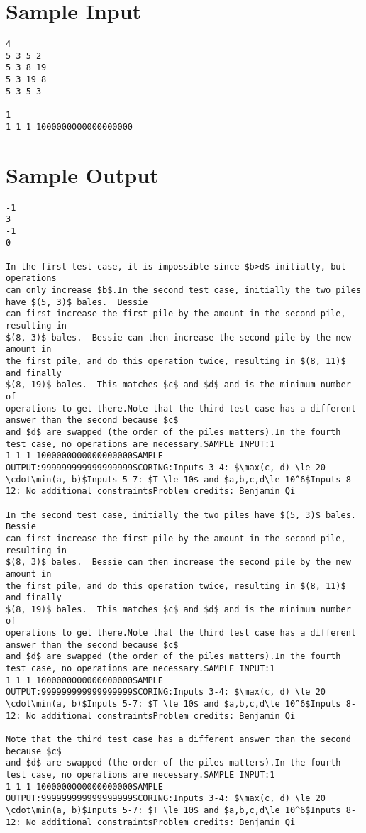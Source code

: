 \documentclass[12pt]{article}
\begin{document}
\section*{Sample Input}
\begin{verbatim}
4
5 3 5 2
5 3 8 19
5 3 19 8
5 3 5 3

1
1 1 1 1000000000000000000
\end{verbatim}

\section*{Sample Output}
\begin{verbatim}
-1
3
-1
0

In the first test case, it is impossible since $b>d$ initially, but operations
can only increase $b$.In the second test case, initially the two piles have $(5, 3)$ bales.  Bessie
can first increase the first pile by the amount in the second pile, resulting in
$(8, 3)$ bales.  Bessie can then increase the second pile by the new amount in
the first pile, and do this operation twice, resulting in $(8, 11)$ and finally
$(8, 19)$ bales.  This matches $c$ and $d$ and is the minimum number of
operations to get there.Note that the third test case has a different answer than the second because $c$
and $d$ are swapped (the order of the piles matters).In the fourth test case, no operations are necessary.SAMPLE INPUT:1
1 1 1 1000000000000000000SAMPLE OUTPUT:999999999999999999SCORING:Inputs 3-4: $\max(c, d) \le 20 \cdot\min(a, b)$Inputs 5-7: $T \le 10$ and $a,b,c,d\le 10^6$Inputs 8-12: No additional constraintsProblem credits: Benjamin Qi

In the second test case, initially the two piles have $(5, 3)$ bales.  Bessie
can first increase the first pile by the amount in the second pile, resulting in
$(8, 3)$ bales.  Bessie can then increase the second pile by the new amount in
the first pile, and do this operation twice, resulting in $(8, 11)$ and finally
$(8, 19)$ bales.  This matches $c$ and $d$ and is the minimum number of
operations to get there.Note that the third test case has a different answer than the second because $c$
and $d$ are swapped (the order of the piles matters).In the fourth test case, no operations are necessary.SAMPLE INPUT:1
1 1 1 1000000000000000000SAMPLE OUTPUT:999999999999999999SCORING:Inputs 3-4: $\max(c, d) \le 20 \cdot\min(a, b)$Inputs 5-7: $T \le 10$ and $a,b,c,d\le 10^6$Inputs 8-12: No additional constraintsProblem credits: Benjamin Qi

Note that the third test case has a different answer than the second because $c$
and $d$ are swapped (the order of the piles matters).In the fourth test case, no operations are necessary.SAMPLE INPUT:1
1 1 1 1000000000000000000SAMPLE OUTPUT:999999999999999999SCORING:Inputs 3-4: $\max(c, d) \le 20 \cdot\min(a, b)$Inputs 5-7: $T \le 10$ and $a,b,c,d\le 10^6$Inputs 8-12: No additional constraintsProblem credits: Benjamin Qi


\end{verbatim}
\end{document}
